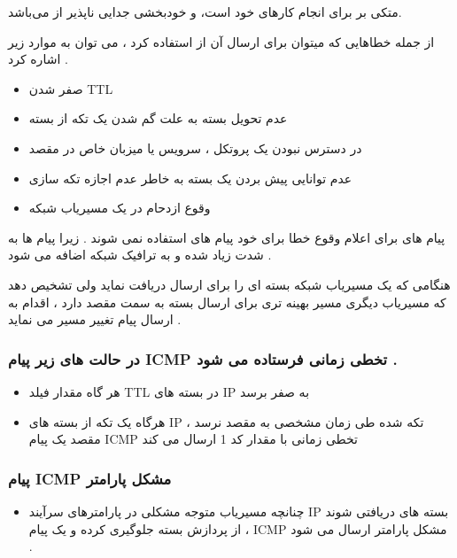\documentclass[12pt]{book}
\begin{document}
متکی بر 
برای انجام کارهای خود است، و خودبخشی جدایی ناپذیر از 
 می‌باشد.
 
از جمله خطاهایی که میتوان برای ارسال آن از
استفاده کرد ، می توان به موارد زیر اشاره کرد .
 
 \begin{itemize}
	\item صفر شدن TTL
	\item عدم تحویل بسته به علت گم شدن یک تکه از بسته
	\item در دسترس نبودن یک پروتکل ، سرویس یا میزبان خاص در مقصد
	\item عدم توانایی پیش بردن یک بسته به خاطر عدم اجازه تکه سازی
	\item وقوع ازدحام در یک مسیریاب شبکه
\end{itemize}
 
 پیام های
برای اعلام وقوع خطا برای خود پیام های
استفاده نمی شوند . زیرا پیام ها به شدت زیاد شده و به ترافیک شبکه اضافه می شود .
 
 
  هنگامی که یک مسیریاب شبکه بسته ای را برای ارسال دریافت نماید ولی تشخیص دهد که مسیریاب دیگری مسیر بهینه تری برای ارسال بسته به سمت مقصد دارد ، 
	اقدام به ارسال پیام 
	 تغییر مسیر می نماید .

\subsubsection{
در حالت های زیر پیام ICMP تخطی زمانی فرستاده می شود .
}

\begin{itemize}
	\item هر گاه مقدار فیلد TTL در بسته های IP به صفر برسد 
	\item هرگاه یک تکه از بسته های IP
	 تکه شده طی زمان مشخصی به مقصد   نرسد ،
 مقصد یک پیام
	 ICMP تخطی زمانی 
	با مقدار کد 1 ارسال می کند
\end{itemize}


\subsubsection{
پیام ICMP مشکل پارامتر 
}

\begin{itemize}
	\item چنانچه مسیریاب متوجه مشکلی در پارامترهای سرآیند IP بسته های دریافتی شوند ،
	از پردازش بسته جلوگیری کرده و یک پیام ICMP 
	مشکل پارامتر ارسال می شود .
\end{itemize}
\end{document}
